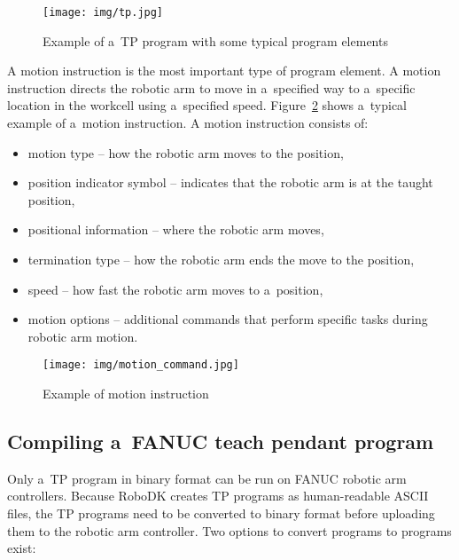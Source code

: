 \begin{figure}[h]
    \centering
    \texttt{[image: img/tp.jpg]}
    \caption[Example of a~TP program with some typical program elements]{Example of a~TP program with some typical program elements \protect\cite{fanuchandling} }
    \label{fig:tp}
\end{figure}

A motion instruction is the most important type of program element. A motion instruction directs the robotic arm to move in a~specified way to a~specific location in the workcell using a~specified speed. Figure~\ref{fig:motion} shows a~typical example of a~motion instruction. A motion instruction consists of:

\begin{itemize}

\item motion type -- how the robotic arm moves to the position,
\item position indicator symbol -- indicates that the robotic arm is at the taught position,
\item positional information -- where the robotic arm moves,
\item termination type -- how the robotic arm ends the move to the position,
\item speed -- how fast the robotic arm moves to a~position,
\item motion options -- additional commands that perform specific tasks during robotic arm motion.

\end{itemize}

\begin{figure}[h!]
    \centering
    \texttt{[image: img/motion\_command.jpg]}
    \caption[Example of motion instruction]{Example of motion instruction \protect\cite{fanuchandling}}
    \label{fig:motion}
\end{figure}


\subsection{Compiling a~FANUC teach pendant program}

Only a~TP program in binary format can be run on FANUC robotic arm controllers. Because RoboDK creates TP programs as human-readable ASCII files, the TP programs need to be converted to binary format before uploading them to the robotic arm controller. Two options to convert  programs to  programs exist:

